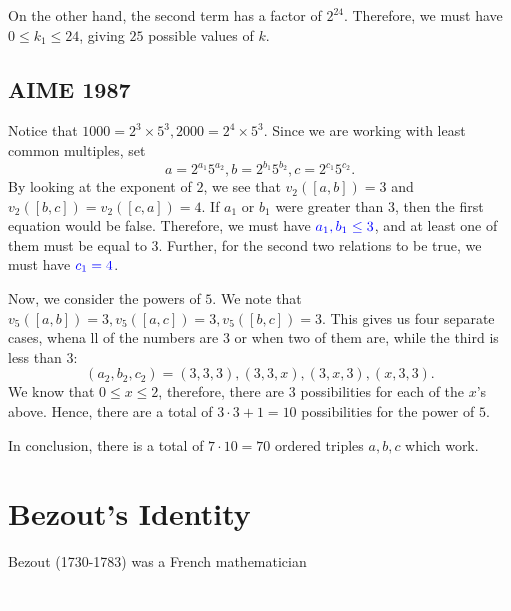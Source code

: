 On the other hand, the second term has a factor of $2^{24}$. Therefore, we must have $0\le k_1\le 24$, giving $\boxed{25}$ possible values of $k$.  
\subsection{AIME 1987}

Notice that $1000=2^3\times 5^3, 2000=2^4\times 5^3$.  Since we are working with least common multiples, set $$a=2^{a_1}5^{a_2}, b=2^{b_1}5^{b_2}, c=2^{c_1}5^{c_2}.$$
By looking at the exponent of $2$, we see that $v_2([a,b])=3$ and $v_2([b,c])=v_2([c,a])=4$.
If $a_1$ or $b_1$ were greater than $3$, then the first equation would be false. Therefore, we must have $\color{blue} a_1, b_1\le 3$, and \color{ForestGreen} at least one of them must be equal to $3$. \color{black} Further, for the second two relations to be true, we must have $\color{blue} c_1=4$.  

Now, we consider the powers of $5$. We note that $v_5([a,b])=3, v_5([a,c])=3, v_5([b,c])=3$. This gives us four separate cases, whena ll of the numbers are $3$ or when two of them are, while the third is less than $3$: $$(a_2, b_2, c_2)=(3,3,3), (3,3,x), (3,x, 3), (x,3,3).$$ We know that $0\le x\le 2$, therefore, there are $3$ possibilities for each of the $x$'s above. Hence, there are a total of $3\cdot 3+1=10$ possibilities for the power of $5$.

In conclusion, there is a total of $7\cdot 10=\boxed{70}$ ordered triples $a,b,c$ which work.  
\clearpage

\section{Bezout's Identity}

Bezout (1730-1783) was a French mathematician 
\clearpage






\clearpage
\thispagestyle{empty} %
\textcolor{white}{\cite{a:1}, \cite{me:1}}



\clearpage






